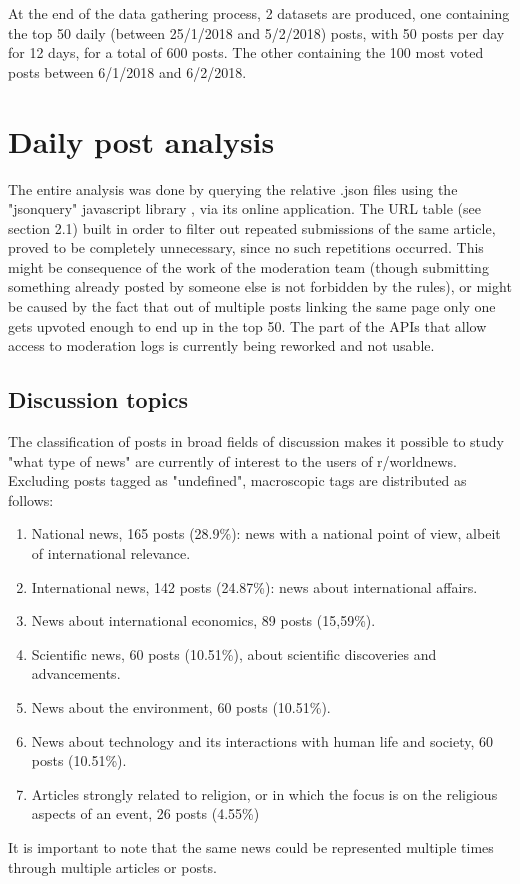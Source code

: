\documentclass{article}
\begin{document}
At the end of the data gathering process, 2 datasets are produced, one containing the top 50 daily (between 25/1/2018 and 5/2/2018) posts, with 50 posts per day for 12 days, for a total of 600 posts. The other containing the 100 most voted posts between 6/1/2018 and 6/2/2018.


\pagebreak
\section{Daily post analysis}
The entire analysis was done by querying the relative .json files using the "jsonquery" javascript library \cite{jsonquery}, via its online application.
The URL table (see section 2.1) built in order to filter out repeated submissions of the same article, proved to be completely unnecessary, since no such repetitions occurred. This might be consequence of the work of the moderation team (though submitting something already posted by someone else is not forbidden by the rules), or might be caused by the fact that out of multiple posts linking the same page only one gets upvoted enough to end up in the top 50.
The part of the APIs that allow access to moderation logs is currently being reworked and not usable.

\subsection{Discussion topics}
The classification of posts in broad fields of discussion makes it possible to study "what type of news" are currently of interest to the users of r/worldnews. Excluding posts tagged as "undefined", macroscopic tags are distributed as follows:
\begin{enumerate}
\item National news, 165 posts (28.9\%): news with a national point of view, albeit of international relevance.
\item International news, 142 posts (24.87\%): news about international affairs.
\item News about international economics, 89 posts (15,59\%).
\item Scientific news, 60 posts (10.51\%), about scientific discoveries and advancements.
\item News about the environment, 60 posts (10.51\%).
\item News about technology and its interactions with human life and society, 60 posts (10.51\%).
\item Articles strongly related to religion, or in which the focus is on the religious aspects of an event, 26 posts (4.55\%)
\end{enumerate}
It is important to note that the same news could be represented multiple times through multiple articles or posts.
\end{document}
